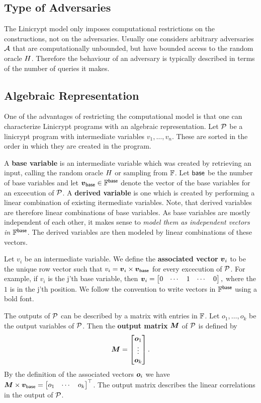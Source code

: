 \subsection{Type of Adversaries}
The Linicrypt model only imposes computational restrictions on the constructions,
not on the adversaries.
Usually one considers arbitrary adversaries $\A$ that are computationally unbounded,
but have bounded access to the random oracle $\H$.
Therefore the behaviour of an adversary is typically described in terms of the number of queries it makes.

\subsection{Algebraic Representation}

One of the advantages of restricting the computational model is that one can characterize
Linicrypt programs with an algebraic representation.
Let $\P$ be a linicrypt program with intermediate variables $v_1, \dots, v_n$.
These are sorted in the order in which they are created in the program.

A \textbf{base variable} is an intermediate variable which was created by retrieving an input,
calling the random oracle $\H$ or sampling from $\F$.
Let $\base$ be the number of base variables
and let $\vbase \in \Base$ denote the vector of the base variables for an excecution of $\P$.
A \textbf{derived variable} is one which is created by performing a linear combination of existing itermediate variables.
Note, that derived variables are therefore linear combinations of base variables.
As base variables are mostly independent of each other,
it makes sense to \emph {model them as independent vectors in $\Base$}.
The derived variables are then modeled by linear combinations of these vectors.

Let $v_i$ be an intermediate variable.
We define the \textbf{associated vector} $\v v_i$ to be the unique row vector such that
$v_i = \v v_i \times \vbase$ for every excecution of $\P$.
For example, if $v_i$ is the j'th base variable, then 
$
  \v v_i = \begin{bmatrix}
  0 & \cdots & 1 & \cdots & 0
  \end{bmatrix},
$
where the $1$ is in the j'th position.
We follow the convention to write vectors in $\Base$ using a bold font.

The outputs of $\P$ can be described by a matrix with entries in $\F$.
Let $o_1, \dots, o_k$ be the output variables of $\P$.
Then the \textbf{output matrix} $\M$ of $\P$ is defined by
\[
  \M =
  \begin{bmatrix}
  \v o_1\\
  \vdots \\
  \v o_k
  \end{bmatrix}
  .
\]
By the definition of the associated vectors $\v o_i$ we have
$
\M \times \vbase = 
  \begin{bmatrix} o_1 & \cdots & o_k \end{bmatrix}^\top
$.
The output matrix describes the linear correlations in the output of $\P$.

